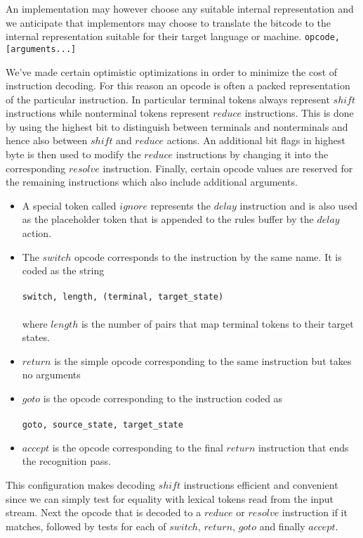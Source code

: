 \documentclass[a4paper,11pt]{article}
\begin{document}
An implementation may however choose any suitable internal representation and we anticipate that implementors may choose to translate the bitcode to the internal representation suitable for their target language or machine.
\texttt{opcode, [arguments...]}

We've made certain optimistic optimizations in order to minimize the cost of instruction decoding. 
For this reason an opcode is often a packed representation of the particular instruction.
In particular terminal tokens always represent $shift$ instructions while nonterminal tokens represent $reduce$ instructions.
This is done by using the highest bit to distinguish between terminals and nonterminals and hence also between $shift$ and $reduce$ actions.
An additional bit flags in highest byte is then used to modify the  $reduce$ instructions by changing it into the corresponding $resolve$ instruction.
Finally, certain opcode values are reserved for the remaining instructions which also include additional arguments.

\begin{itemize}
\item A special token called $ignore$ represents the $delay$ instruction and is also used as the placeholder token that is appended to the rules buffer by the $delay$ action.
\item The $switch$ opcode corresponds to the instruction by the same name. It is coded as the string\\\\
      \texttt{switch, length, (terminal, target\_state)\*}\\\\
      where $length$ is the number of pairs that map terminal tokens to their target states.
\item $return$ is the simple opcode corresponding to the same instruction but takes no arguments
\item $goto$ is the opcode corresponding to the instruction coded as\\\\
      \texttt{goto, source\_state, target\_state}\\
\item $accept$ is the opcode corresponding to the final $return$ instruction that ends the recognition pass.
\end{itemize}

This configuration makes decoding $shift$ instructions efficient and convenient since we can simply test for equality with lexical tokens read from the input stream. 
Next the opcode that is decoded to a $reduce$ or $resolve$ instruction if it matches, followed by tests for each of $switch$, $return$, $goto$ and finally $accept$.
\end{document}
